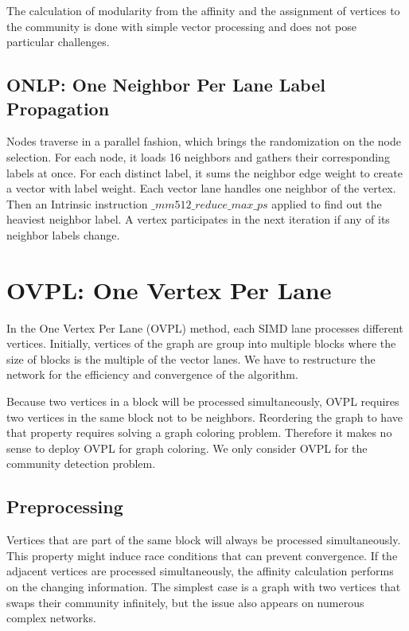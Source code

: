 \documentclass[default,iicol]{sn-jnl}%
\theoremstyle{thmstyleone}%
\theoremstyle{thmstyletwo}%
\theoremstyle{thmstylethree}%
\begin{document}
The calculation of modularity from the affinity and the assignment of vertices to the community is done with simple vector processing and 
does not pose particular challenges.

\subsection{ONLP: One Neighbor Per Lane Label Propagation}
Nodes traverse in a parallel fashion, which brings the randomization on the node selection. For each node, 
it loads 16 neighbors and gathers their corresponding labels at once. For each distinct label, it sums the 
neighbor edge weight to create a vector with label weight. Each vector lane handles one neighbor of the 
vertex. Then an Intrinsic instruction \textit{$\_mm512\_reduce\_max\_ps$} applied to find out the heaviest neighbor label. 
A vertex participates in the next iteration if any of its neighbor labels change.


\section{OVPL: One Vertex Per Lane}
\label{sec:ovpl}
In the One Vertex Per Lane (OVPL) method, each SIMD lane processes different vertices. 
Initially, vertices of the graph are group into multiple blocks where the size of blocks is the multiple of the vector lanes.
We have to restructure the network for the efficiency and convergence of the algorithm.

Because two vertices in a block will be processed simultaneously, OVPL requires two vertices in the same block 
not to be neighbors. Reordering the graph to have that property requires solving a graph coloring problem. 
Therefore it makes no sense to deploy OVPL for graph coloring. We only consider OVPL for the community detection problem.
\subsection{Preprocessing}
Vertices that are part of the same block will always be processed simultaneously. This property might induce race conditions 
that can prevent convergence. If the adjacent vertices are processed simultaneously, the affinity calculation performs on the 
changing information. The simplest case is a graph with two vertices that swaps their community infinitely, but the issue also 
appears on numerous complex networks.
\end{document}
